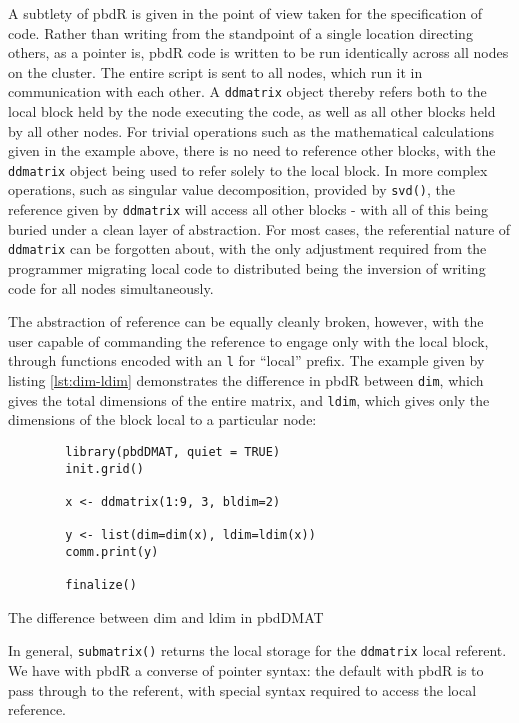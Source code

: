 A subtlety of pbdR is given in the point of view taken for the
specification of code. Rather than writing from the standpoint of a
single location directing others, as a pointer is, pbdR code is written
to be run identically across all nodes on the cluster. The entire script
is sent to all nodes, which run it in communication with each other. A
\texttt{ddmatrix} object thereby refers both to the local block held by
the node executing the code, as well as all other blocks held by all
other nodes. For trivial operations such as the mathematical
calculations given in the example above, there is no need to reference
other blocks, with the \texttt{ddmatrix} object being used to refer
solely to the local block. In more complex operations, such as singular
value decomposition, provided by \texttt{svd()}, the reference given by
\texttt{ddmatrix} will access all other blocks - with all of this being
buried under a clean layer of abstraction. For most cases, the
referential nature of \texttt{ddmatrix} can be forgotten about, with the
only adjustment required from the programmer migrating local code to
distributed being the inversion of writing code for all nodes
simultaneously.

The abstraction of reference can be equally cleanly broken, however,
with the user capable of commanding the reference to engage only with
the local block, through functions encoded with an \texttt{l} for
``local'' prefix. The example given by listing \ref{lst:dim-ldim} demonstrates the difference in
pbdR between \texttt{dim}, which gives the total dimensions of the
entire matrix, and \texttt{ldim}, which gives only the dimensions of the
block local to a particular node:

\begin{listing}
    \begin{verbatim}
        library(pbdDMAT, quiet = TRUE)
        init.grid()
        
        x <- ddmatrix(1:9, 3, bldim=2)
        
        y <- list(dim=dim(x), ldim=ldim(x))
        comm.print(y)
        
        finalize()
    \end{verbatim}
    \caption{The difference between dim and ldim in pbdDMAT}
    \label{lst:dim-ldim}
\end{listing}

In general, \texttt{submatrix()} returns the local storage for the
\texttt{ddmatrix} local referent. We have with pbdR a converse of
pointer syntax: the default with pbdR is to pass through to the
referent, with special syntax required to access the local reference.

